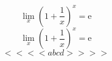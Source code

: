 \documentclass{article}
\begin{document}
$$\lim_x(1+\frac{1}{x})^x=\mathrm{e}$$
$$\lim_x\left(1+\frac{1}{x}\right)^x=\mathrm{e}$$
$$\Bigg<\bigg<\Big<\big<abcd\big>\Big>\bigg>\Bigg>$$
\end{document}
